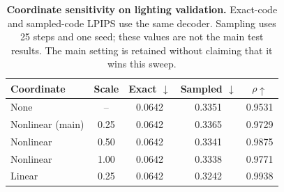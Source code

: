 \begin{table}[t]
\centering
\caption{\textbf{Coordinate sensitivity on lighting validation.} Exact-code
and sampled-code LPIPS use the same decoder. Sampling uses 25 steps and one
seed; these values are not the main test results. The main setting is retained
without claiming that it wins this sweep.}
\label{tab:coordinate_ablation}
\scriptsize
\setlength{\tabcolsep}{3.2pt}
\renewcommand{\arraystretch}{1.12}
\begin{tabular*}{\linewidth}{@{\extracolsep{\fill}}lcccc@{}}
\toprule
Coordinate & Scale & Exact $\downarrow$ & Sampled $\downarrow$ & $\rho\uparrow$\\
\midrule
None & -- & 0.0642 & 0.3351 & 0.9531 \\
Nonlinear (main) & 0.25 & 0.0642 & 0.3365 & 0.9729 \\
Nonlinear & 0.50 & 0.0642 & 0.3341 & 0.9875 \\
Nonlinear & 1.00 & 0.0642 & 0.3338 & 0.9771 \\
Linear & 0.25 & 0.0642 & 0.3242 & 0.9938 \\
\bottomrule
\end{tabular*}
\end{table}
